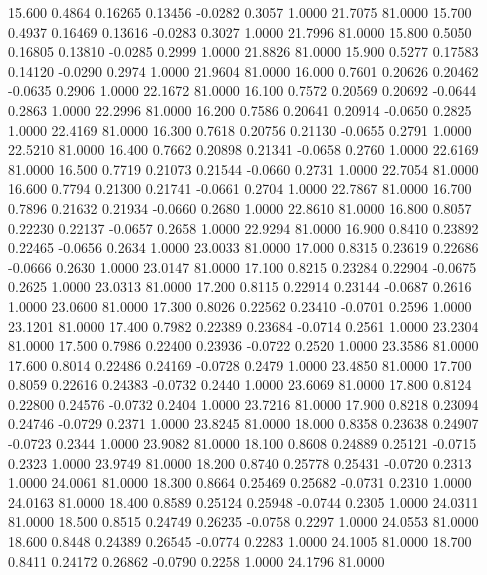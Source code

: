   15.600   0.4864   0.16265   0.13456  -0.0282   0.3057   1.0000  21.7075  81.0000
  15.700   0.4937   0.16469   0.13616  -0.0283   0.3027   1.0000  21.7996  81.0000
  15.800   0.5050   0.16805   0.13810  -0.0285   0.2999   1.0000  21.8826  81.0000
  15.900   0.5277   0.17583   0.14120  -0.0290   0.2974   1.0000  21.9604  81.0000
  16.000   0.7601   0.20626   0.20462  -0.0635   0.2906   1.0000  22.1672  81.0000
  16.100   0.7572   0.20569   0.20692  -0.0644   0.2863   1.0000  22.2996  81.0000
  16.200   0.7586   0.20641   0.20914  -0.0650   0.2825   1.0000  22.4169  81.0000
  16.300   0.7618   0.20756   0.21130  -0.0655   0.2791   1.0000  22.5210  81.0000
  16.400   0.7662   0.20898   0.21341  -0.0658   0.2760   1.0000  22.6169  81.0000
  16.500   0.7719   0.21073   0.21544  -0.0660   0.2731   1.0000  22.7054  81.0000
  16.600   0.7794   0.21300   0.21741  -0.0661   0.2704   1.0000  22.7867  81.0000
  16.700   0.7896   0.21632   0.21934  -0.0660   0.2680   1.0000  22.8610  81.0000
  16.800   0.8057   0.22230   0.22137  -0.0657   0.2658   1.0000  22.9294  81.0000
  16.900   0.8410   0.23892   0.22465  -0.0656   0.2634   1.0000  23.0033  81.0000
  17.000   0.8315   0.23619   0.22686  -0.0666   0.2630   1.0000  23.0147  81.0000
  17.100   0.8215   0.23284   0.22904  -0.0675   0.2625   1.0000  23.0313  81.0000
  17.200   0.8115   0.22914   0.23144  -0.0687   0.2616   1.0000  23.0600  81.0000
  17.300   0.8026   0.22562   0.23410  -0.0701   0.2596   1.0000  23.1201  81.0000
  17.400   0.7982   0.22389   0.23684  -0.0714   0.2561   1.0000  23.2304  81.0000
  17.500   0.7986   0.22400   0.23936  -0.0722   0.2520   1.0000  23.3586  81.0000
  17.600   0.8014   0.22486   0.24169  -0.0728   0.2479   1.0000  23.4850  81.0000
  17.700   0.8059   0.22616   0.24383  -0.0732   0.2440   1.0000  23.6069  81.0000
  17.800   0.8124   0.22800   0.24576  -0.0732   0.2404   1.0000  23.7216  81.0000
  17.900   0.8218   0.23094   0.24746  -0.0729   0.2371   1.0000  23.8245  81.0000
  18.000   0.8358   0.23638   0.24907  -0.0723   0.2344   1.0000  23.9082  81.0000
  18.100   0.8608   0.24889   0.25121  -0.0715   0.2323   1.0000  23.9749  81.0000
  18.200   0.8740   0.25778   0.25431  -0.0720   0.2313   1.0000  24.0061  81.0000
  18.300   0.8664   0.25469   0.25682  -0.0731   0.2310   1.0000  24.0163  81.0000
  18.400   0.8589   0.25124   0.25948  -0.0744   0.2305   1.0000  24.0311  81.0000
  18.500   0.8515   0.24749   0.26235  -0.0758   0.2297   1.0000  24.0553  81.0000
  18.600   0.8448   0.24389   0.26545  -0.0774   0.2283   1.0000  24.1005  81.0000
  18.700   0.8411   0.24172   0.26862  -0.0790   0.2258   1.0000  24.1796  81.0000
